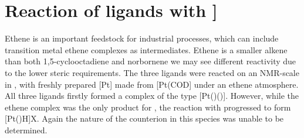 
\section{Reaction of \tBuxantphos{} ligands with \texorpdfstring{\ce{[Pt(C2H4)3}]} P}

Ethene is an important feedstock for industrial processes, which can include transition metal ethene complexes as intermediates.\cite{Yoneda2001, Degnan2001}  Ethene is a smaller alkene than both 1,5-cyclooctadiene and norbornene we may see different reactivity due to the lower steric requirements.  The three \tBuxantphos{} ligands were reacted on an NMR-scale in , with freshly prepared [Pt] made from [Pt(COD] under an ethene atmosphere.  All three ligands firstly formed a complex of the type [Pt(\tBuxantphos{})()].  However, while the ethene complex was the only product for \tButhixantphos, the reaction with \tBuxantphos{} progressed to form [Pt(\tBuxantphos)H]X.  Again the nature of the counterion in this species was unable to be determined.  

